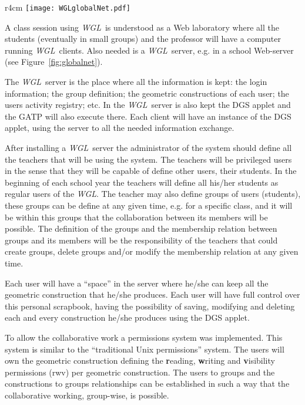 \documentclass{llncs}
\newcommand{\WGL}{{\em WGL}}
\begin{document}
\begin{wrapfigure}[10]{r}{4cm} 
  \texttt{[image: WGLglobalNet.pdf]}
  \caption{School Server}
  \label{fig:globalnet}
\end{wrapfigure}

A class session using \WGL\ is understood as a Web laboratory where
all the students (eventually in small groups) and the professor will
have a computer running \WGL\ clients. Also needed is a \WGL\ server,
e.g. in a school Web-server (see Figure~\ref{fig:globalnet}).

The \WGL\ server is the place where all the information is kept: the
login information; the group definition; the geometric constructions
of each user; the users activity registry; etc. In the \WGL\ server is
also kept the DGS applet and the GATP will also execute there. Each
client will have an instance of the DGS applet, using the server to
all the needed information exchange.

After installing a \WGL\ server the administrator of the system should
define all the teachers that will be using the system. The teachers
will be privileged users in the sense that they will be capable of
define other users, their students. In the beginning of each school
year the teachers will define all his/her students as regular users of
the \WGL. The teacher may also define groups of users (students),
these groups can be define at any given time, e.g. for a specific
class, and it will be within this groups that the collaboration
between its members will be possible. The definition of the groups and
the membership relation between groups and its members will be the
responsibility of the teachers that could create groups, delete groups
and/or modify the membership relation at any given time.

Each user will have a ``space'' in the server where he/she can keep
all the geometric construction that he/she produces. Each user will
have full control over this personal scrapbook, having the possibility
of saving, modifying and deleting each and every construction he/she
produces using the DGS applet.

To allow the collaborative work a permissions system was
implemented. This system is similar to the ``traditional Unix
permissions'' system. The users will own the geometric construction
defining the {\bf r}eading, {\bf w}riting and {\bf v}isibility
permissions (rwv) per geometric construction. The users to groups and
the constructions to groups relationships can be established in such a
way that the collaborative working, group-wise, is possible.
\end{document}

